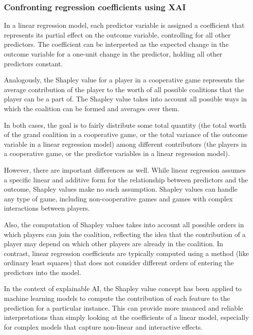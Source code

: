 \documentclass[
  letterpaper,
  DIV=11,
  numbers=noendperiod]{scrartcl}
\begin{document}
\hypertarget{confronting-regression-coefficients-using-xai}{%
\subsubsection{Confronting regression coefficients using
XAI}\label{confronting-regression-coefficients-using-xai}}

In a linear regression model, each predictor variable is assigned a
coefficient that represents its partial effect on the outcome variable,
controlling for all other predictors. The coefficient can be interpreted
as the expected change in the outcome variable for a one-unit change in
the predictor, holding all other predictors constant.

Analogously, the Shapley value for a player in a cooperative game
represents the average contribution of the player to the worth of all
possible coalitions that the player can be a part of. The Shapley value
takes into account all possible ways in which the coalition can be
formed and averages over them.

In both cases, the goal is to fairly distribute some total quantity (the
total worth of the grand coalition in a cooperative game, or the total
variance of the outcome variable in a linear regression model) among
different contributors (the players in a cooperative game, or the
predictor variables in a linear regression model).

However, there are important differences as well. While linear
regression assumes a specific linear and additive form for the
relationship between predictors and the outcome, Shapley values make no
such assumption. Shapley values can handle any type of game, including
non-cooperative games and games with complex interactions between
players.

Also, the computation of Shapley values takes into account all possible
orders in which players can join the coalition, reflecting the idea that
the contribution of a player may depend on which other players are
already in the coalition. In contrast, linear regression coefficients
are typically computed using a method (like ordinary least squares) that
does not consider different orders of entering the predictors into the
model.

In the context of explainable AI, the Shapley value concept has been
applied to machine learning models to compute the contribution of each
feature to the prediction for a particular instance. This can provide
more nuanced and reliable interpretations than simply looking at the
coefficients of a linear model, especially for complex models that
capture non-linear and interactive effects.
\end{document}
